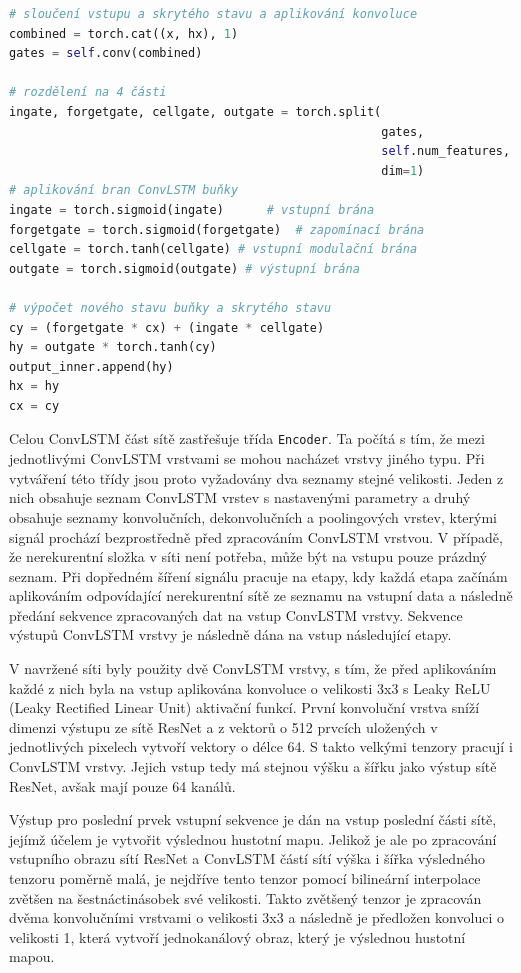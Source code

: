 \begin{lstlisting}[language=Python, caption={kód popisující dopředné šíření signálu v ConvLSTM vrstvě}]    
# sloučení vstupu a skrytého stavu a aplikování konvoluce
combined = torch.cat((x, hx), 1)
gates = self.conv(combined) 

# rozdělení na 4 části
ingate, forgetgate, cellgate, outgate = torch.split(
													gates,
													self.num_features,
													dim=1)
# aplikování bran ConvLSTM buňky
ingate = torch.sigmoid(ingate)		# vstupní brána
forgetgate = torch.sigmoid(forgetgate)	# zapomínací brána
cellgate = torch.tanh(cellgate)	# vstupní modulační brána
outgate = torch.sigmoid(outgate) # výstupní brána

# výpočet nového stavu buňky a skrytého stavu
cy = (forgetgate * cx) + (ingate * cellgate)
hy = outgate * torch.tanh(cy)
output_inner.append(hy)
hx = hy
cx = cy
\end{lstlisting}

Celou ConvLSTM část sítě zastřešuje třída \texttt{Encoder}.
Ta počítá s tím, že mezi jednotlivými ConvLSTM vrstvami se mohou nacházet vrstvy jiného typu.
Při vytváření této třídy jsou proto vyžadovány dva seznamy stejné velikosti.
Jeden z nich obsahuje seznam ConvLSTM vrstev s nastavenými parametry a druhý obsahuje seznamy konvolučních, dekonvolučních a poolingových vrstev, kterými signál prochází bezprostředně před zpracováním ConvLSTM vrstvou.
V případě, že nerekurentní složka v síti není potřeba, může být na vstupu pouze prázdný seznam.
Při dopředném šíření signálu pracuje na etapy, kdy každá etapa začínám aplikováním odpovídající nerekurentní sítě ze seznamu na vstupní data a následně předání sekvence zpracovaných dat na vstup ConvLSTM vrstvy.
Sekvence výstupů ConvLSTM vrstvy je následně dána na vstup následující etapy.

V navržené síti byly použity dvě ConvLSTM vrstvy, s tím, že před aplikováním každé z nich byla na vstup aplikována konvoluce o velikosti 3x3 s Leaky ReLU (Leaky Rectified Linear Unit) \cite{LeakyReLU} aktivační funkcí.
První konvoluční vrstva sníží dimenzi výstupu ze sítě ResNet a z vektorů o 512 prvcích uložených v jednotlivých pixelech vytvoří vektory o délce 64. 
S takto velkými tenzory pracují i ConvLSTM vrstvy.
Jejich vstup tedy má stejnou výšku a šířku jako výstup sítě ResNet, avšak mají pouze 64 kanálů.

Výstup pro poslední prvek vstupní sekvence je dán na vstup poslední části sítě, jejímž účelem je vytvořit výslednou hustotní mapu.
Jelikož je ale po zpracování vstupního obrazu sítí ResNet a ConvLSTM částí sítí výška i šířka výsledného tenzoru poměrně malá, je nejdříve tento tenzor pomocí bilineární interpolace zvětšen na šestnáctinásobek své velikosti.
Takto zvětšený tenzor je zpracován dvěma konvolučními vrstvami o velikosti 3x3 a následně je předložen konvoluci o velikosti 1, která vytvoří jednokanálový obraz, který je výslednou hustotní mapou.

